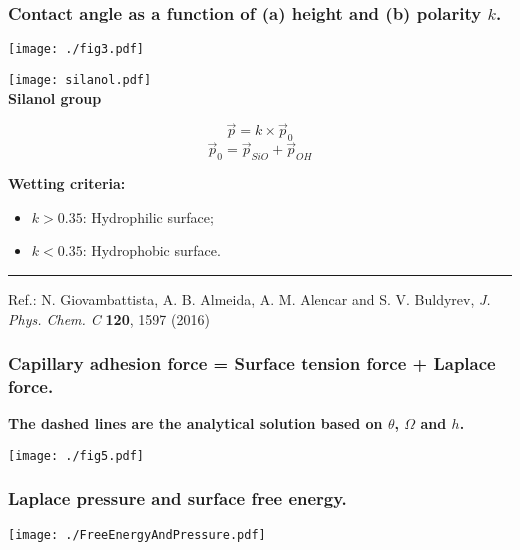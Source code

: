 \documentclass[8pt]{beamer}
\begin{document}
\begin{frame}
\frametitle{Contact angle as a function of (a) height and  (b) polarity $k$.}
  	  \begin{center}
		\texttt{[image: ./fig3.pdf]}
	  \end{center}
	  \vspace{0.5cm}
      \begin{minipage}{0.2\textwidth}
		\begin{center}
			\texttt{[image: silanol.pdf]}\\
     	    {\small \bf Silanol group}
		\end{center}
      \end{minipage}				
      \begin{minipage}{0.33\textwidth}
	 	 $$\overrightarrow{p} = k\times \overrightarrow{p}_{0}$$ 
	     $$\overrightarrow{p}_0 = \overrightarrow{p}_{SiO} + \overrightarrow{p}_{OH}$$ 	
      \end{minipage}		
      \begin{minipage}{0.45\textwidth}
      	\textbf{Wetting criteria:}
 	     \begin{itemize}
            \item $k > 0.35$: Hydrophilic surface;
	        \item $k < 0.35$: Hydrophobic surface.
	     \end{itemize}		
      \end{minipage}

\vspace{0.75cm}
\rule{\textwidth}{0.5pt}
\footnotesize{Ref.: N. Giovambattista, A. B. Almeida, A. M. Alencar and S. V. Buldyrev, \textit{J. Phys. Chem. C } \textbf{120}, 1597 (2016)}
\end{frame}

\begin{frame}
	\frametitle{Capillary adhesion force = Surface tension force + Laplace force.}
	\begin{center}
		\textbf{The dashed lines are the analytical solution based on $\theta$, $\Omega$ and $h$. }
	\end{center}	
	\begin{center}
		\texttt{[image: ./fig5.pdf]}   
	\end{center}
\end{frame}

\begin{frame}
	\frametitle{Laplace pressure and surface free energy.}
	\begin{center}
		\texttt{[image: ./FreeEnergyAndPressure.pdf]}   
	\end{center}
\end{frame}
\end{document}
